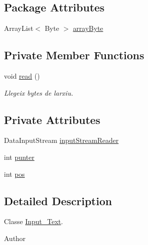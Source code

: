 \subsection*{Package Attributes}
\begin{DoxyCompactItemize}
\item 
Array\+List$<$ Byte $>$ \hyperlink{classpersistencia_1_1input_1_1Input__Text_ab29b20f25abf37ab5fa9fd86e446fdf5}{array\+Byte}
\end{DoxyCompactItemize}
\subsection*{Private Member Functions}
\begin{DoxyCompactItemize}
\item 
\mbox{\label{classpersistencia_1_1input_1_1Input__Text_a7a9380838f5fe9c753c1e94a8cf47437}} 
void \hyperlink{classpersistencia_1_1input_1_1Input__Text_a7a9380838f5fe9c753c1e94a8cf47437}{read} ()
\begin{DoxyCompactList}\small\item\em Llegeix bytes de l\textquotesingle{}arxiu. \end{DoxyCompactList}\end{DoxyCompactItemize}
\subsection*{Private Attributes}
\begin{DoxyCompactItemize}
\item 
Data\+Input\+Stream \hyperlink{classpersistencia_1_1input_1_1Input__Text_a032eea39e81853708f2c0d1358d08301}{input\+Stream\+Reader}
\item 
int \hyperlink{classpersistencia_1_1input_1_1Input__Text_a38dcfc8b8b79a8820e42f4ed6031ea01}{punter}
\item 
int \hyperlink{classpersistencia_1_1input_1_1Input__Text_a89dcd598f4620d041db312f0aa2ca19a}{pos}
\end{DoxyCompactItemize}


\subsection{Detailed Description}
Classe \hyperlink{classpersistencia_1_1input_1_1Input__Text}{Input\+\_\+\+Text}. 

\begin{DoxyAuthor}{Author}

\end{DoxyAuthor}


